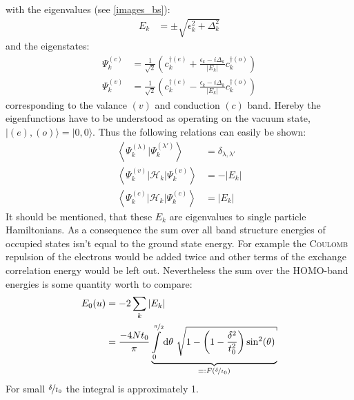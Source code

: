 with the eigenvalues (see \cref{images_bs}):
\begin{align}
	E_k &= \pm \sqrt{\epsilon_k^2+\Delta_k^2}
	\label{equation_energy_band}
\end{align}
and the eigenstates:
\begin{align}
	\Psi_k^{(c)} &= \frac{1}{\sqrt{2}}\left(c_k^{\dagger(e)}+\frac{\epsilon_k - i \Delta_k}{|E_k|}c_{k}^{\dagger(o)}\right)
	\label{equation_conduction_eigenstate}\\
	\Psi_k^{(v)} &= \frac{1}{\sqrt{2}}\left(c_k^{\dagger(e)}-\frac{\epsilon_k - i \Delta_k}{|E_k|}c_{k}^{\dagger(o)}\right)
	\label{equation_valence_eigenstate}
\end{align}
corresponding to the valance $(v)$ and conduction $(c)$ band. Hereby the eigenfunctions have to be understood as operating on the vacuum state, $|(e),(o)\rangle = |0,0\rangle$. Thus the following relations can easily be shown:
\begin{align}
	\left\langle\Psi_k^{(\lambda)}\Big|\Psi_k^{(\lambda\prime)}\right\rangle &= \delta_{\lambda,\lambda\prime}\\
	\left\langle\Psi_k^{(v)}\Big|\mathcal{H}_{k}\Big|\Psi_k^{(v)}\right\rangle &= - |E_k|\\
	\left\langle\Psi_k^{(c)}\Big|\mathcal{H}_{k}\Big|\Psi_k^{(c)}\right\rangle &= |E_k|
\end{align}
It should be mentioned, that these $E_k$ are eigenvalues to single particle Hamiltonians. As a consequence the sum over all band structure energies of occupied states isn't equal to the ground state energy. For example the \textsc{Coulomb} repulsion of the electrons would be added twice and other terms of the exchange correlation energy would be left out. Nevertheless the sum over the HOMO-band energies is some quantity worth to compare:
\begin{align}
	E_0(u) &=-2\sum_k |E_k|\\
	&=\frac{-4Nt_0}{\pi}\underbrace{\int\limits_{0}^{\nicefrac{\pi}{2}}\text{d}\theta\ \sqrt{1-\left(1-\frac{\delta^2}{t_0^2}\right)\sin^2(\theta)}}_{=:F(\nicefrac{\delta}{t_0})}
\end{align}
For small $\nicefrac{\delta}{t_0}$ the integral is approximately 1.\\